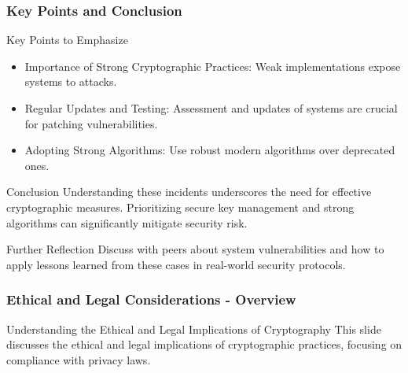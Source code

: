 \documentclass{beamer}
\begin{document}
\begin{frame}[fragile]
    \frametitle{Key Points and Conclusion}
    \begin{block}{Key Points to Emphasize}
        \begin{itemize}
            \item Importance of Strong Cryptographic Practices: Weak implementations expose systems to attacks.
            \item Regular Updates and Testing: Assessment and updates of systems are crucial for patching vulnerabilities.
            \item Adopting Strong Algorithms: Use robust modern algorithms over deprecated ones.
        \end{itemize}
    \end{block}
    
    \begin{block}{Conclusion}
        Understanding these incidents underscores the need for effective cryptographic measures. Prioritizing secure key management and strong algorithms can significantly mitigate security risk.
    \end{block}
    
    \begin{block}{Further Reflection}
        Discuss with peers about system vulnerabilities and how to apply lessons learned from these cases in real-world security protocols.
    \end{block}
\end{frame}

\begin{frame}[fragile]
    \frametitle{Ethical and Legal Considerations - Overview}
    \begin{block}{Understanding the Ethical and Legal Implications of Cryptography}
        This slide discusses the ethical and legal implications of cryptographic practices, focusing on compliance with privacy laws.
    \end{block}
\end{frame}
\end{document}
